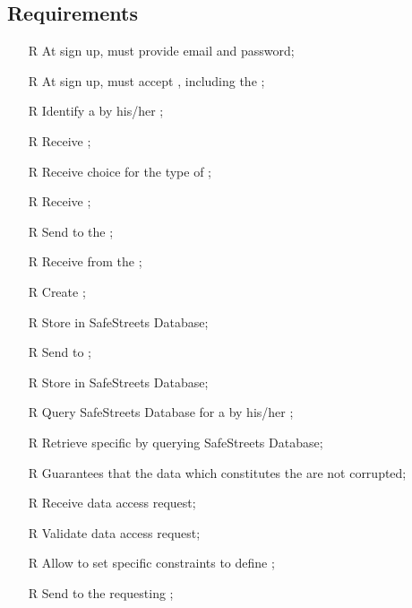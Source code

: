 \documentclass[../../../rasd.tex]{subfiles}
\begin{document}
\subsection{Requirements\label{sect:3.2.5}}
\begin{itemize}
	
	
	\item[R\subs{1}]At sign up,  must provide email and password;
	\item[R\subs{2}]At sign up,  must accept , including the ;
	\item[R\subs{3}]Identify a  by his/her ;
	\item[R\subs{4}]Receive ;
	\item[R\subs{5}]Receive  choice for the type of ;
	\item[R\subs{6}]Receive ;
	\item[R\subs{7}]Send  to the ;
	\item[R\subs{8}]Receive  from the ;
	\item[R\subs{9}]Create ;
	\item[R\subs{10}]Store  in SafeStreets Database;
	\item[R\subs{11}]Send  to ;
	\item[R\subs{12}]Store  in SafeStreets Database;
	\item[R\subs{13}]Query SafeStreets Database for a  by his/her ; %
	\item[R\subs{14}]Retrieve specific  by querying SafeStreets Database; %
	\item[R\subs{15}]Guarantees that the data which constitutes the  are not corrupted; %
	\item[R\subs{16}]Receive  data access request;
	\item[R\subs{17}]Validate  data access request;
	\item[R\subs{18}]Allow  to set specific constraints to define ;
	\item[R\subs{19}]Send  to the requesting ;

\end{itemize}
\end{document}

